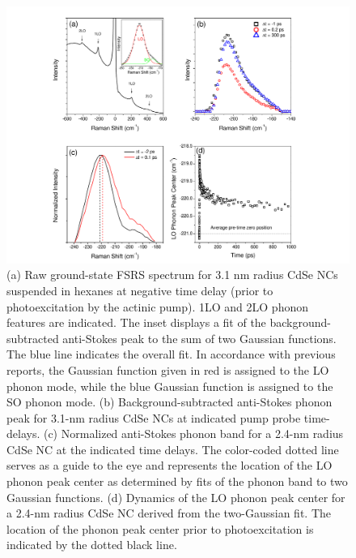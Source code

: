 \begin{figure}
\begin{center}
\includegraphics[width=\textwidth]{./Chapter2/fsrs2.pdf}
\caption[Features of FSRS spectra of CdSe NCs.]{(a) Raw ground-state FSRS spectrum for 3.1 nm radius CdSe NCs suspended in hexanes at negative time delay (prior to photoexcitation by the actinic pump). 1LO and 2LO phonon features are indicated. The inset displays a fit of the background-subtracted anti-Stokes peak to the sum of two Gaussian functions. The blue line indicates the overall fit. In accordance with previous reports, the Gaussian function given in red is assigned to the LO phonon mode, while the blue Gaussian function is assigned to the SO phonon mode. (b) Background-subtracted anti-Stokes phonon peak for 3.1-nm radius CdSe NCs at indicated pump probe time-delays. (c) Normalized anti-Stokes phonon band for a 2.4-nm radius CdSe NC at the indicated time delays. The color-coded dotted line serves as a guide to the eye and represents the location of the LO phonon peak center as determined by fits of the phonon band to two Gaussian functions. (d) Dynamics of the LO phonon peak center for a 2.4-nm radius CdSe NC derived from the two-Gaussian fit. The location of the phonon peak center prior to photoexcitation is indicated by the dotted black line.}
\label{f:fsrs2}
\end{center}
\end{figure}

